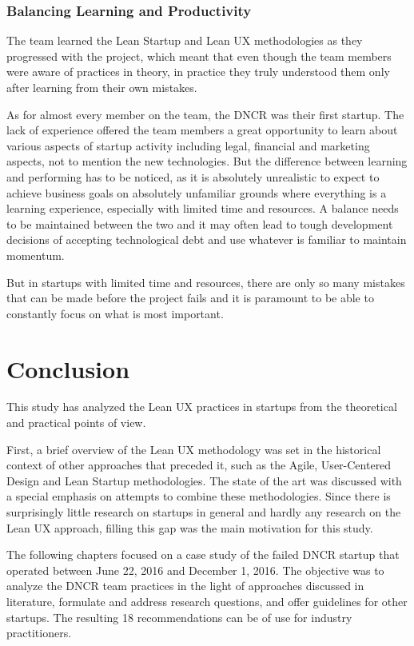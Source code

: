 \documentclass{article}
\begin{document}
\subsubsection{Balancing Learning and Productivity}
The team learned the Lean Startup and Lean UX methodologies as they progressed with the project, which meant that even though the team members were aware of practices in theory, in practice they truly understood them only after learning from their own mistakes.

As for almost every member on the team, the DNCR was their first startup. The lack of experience offered the team members a great opportunity to learn about various aspects of startup activity including legal, financial and marketing aspects, not to mention the new technologies. But the difference between learning and performing has to be noticed, as it is absolutely unrealistic to expect to achieve business goals on absolutely unfamiliar grounds where everything is a learning experience, especially with limited time and resources. A balance needs to be maintained between the two and it may often lead to tough development decisions of accepting technological debt and use whatever is familiar to maintain momentum.

But in startups with limited time and resources, there are only so many mistakes that can be made before the project fails and it is paramount to be able to constantly focus on what is most important.

\section{Conclusion}
This study has analyzed the Lean UX practices in startups from the theoretical and practical points of view.

First, a brief overview of the Lean UX methodology was set in the historical context of other approaches that preceded it, such as the Agile, User-Centered Design and Lean Startup methodologies. The state of the art was discussed with a special emphasis on attempts to combine these methodologies. Since there is surprisingly little research on startups in general and hardly any research on the Lean UX approach, filling this gap was the main motivation for this study.

The following chapters focused on a case study of the failed DNCR startup that operated between June 22, 2016 and December 1, 2016. The objective was to analyze the DNCR team practices in the light of approaches discussed in literature, formulate and address research questions, and offer guidelines for other startups. The resulting 18 recommendations can be of use for industry practitioners.
\end{document}
